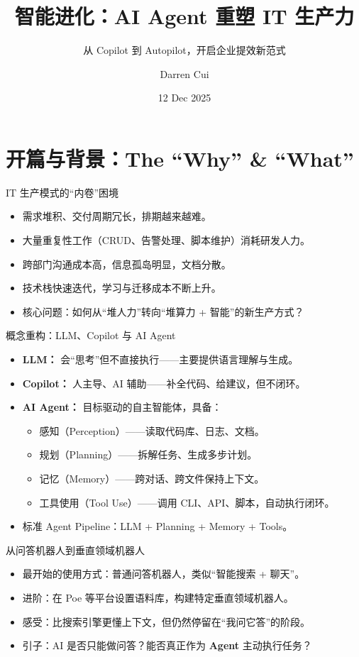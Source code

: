 \documentclass[10pt,aspectratio=169]{beamer}
\title{智能进化：AI Agent 重塑 IT 生产力}
\subtitle{从 Copilot 到 Autopilot，开启企业提效新范式}
\author{Darren Cui}
\institute{HKHPC}
\date{12 Dec 2025}
\begin{document}
\begin{frame}
  \titlepage
\end{frame}

\section{开篇与背景：The ``Why'' \& ``What''}

\begin{frame}{IT 生产模式的“内卷”困境}
  \begin{itemize}
    \item 需求堆积、交付周期冗长，排期越来越难。
    \item 大量重复性工作（CRUD、告警处理、脚本维护）消耗研发人力。
    \item 跨部门沟通成本高，信息孤岛明显，文档分散。
    \item 技术栈快速迭代，学习与迁移成本不断上升。
    \item 核心问题：如何从“堆人力”转向“堆算力 + 智能”的新生产方式？
  \end{itemize}
\end{frame}

\begin{frame}{概念重构：LLM、Copilot 与 AI Agent}
  \begin{itemize}
    \item \textbf{LLM：} 会“思考”但不直接执行——主要提供语言理解与生成。
    \item \textbf{Copilot：} 人主导、AI 辅助——补全代码、给建议，但不闭环。
    \item \textbf{AI Agent：} 目标驱动的自主智能体，具备：
      \begin{itemize}
        \item 感知（Perception）——读取代码库、日志、文档。
        \item 规划（Planning）——拆解任务、生成多步计划。
        \item 记忆（Memory）——跨对话、跨文件保持上下文。
        \item 工具使用（Tool Use）——调用 CLI、API、脚本，自动执行闭环。
      \end{itemize}
    \item 标准 Agent Pipeline：LLM + Planning + Memory + Tools。
  \end{itemize}
\end{frame}

\begin{frame}{从问答机器人到垂直领域机器人}
  \begin{itemize}
    \item 最开始的使用方式：普通问答机器人，类似“智能搜索 + 聊天”。
    \item 进阶：在 Poe 等平台设置语料库，构建特定垂直领域机器人。
    \item 感受：比搜索引擎更懂上下文，但仍然停留在“我问它答”的阶段。
    \item 引子：AI 是否只能做问答？能否真正作为 \textbf{Agent} 主动执行任务？
  \end{itemize}
\end{frame}
\end{document}
